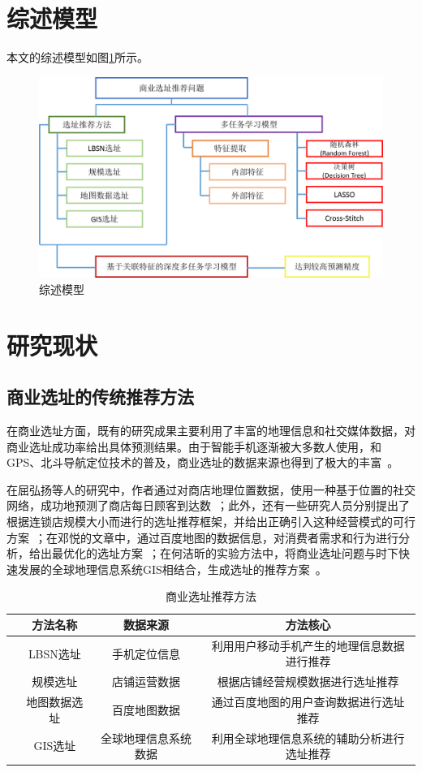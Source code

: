 \documentclass{llncs}
\begin{document}
\section{综述模型}
本文的综述模型如图\ref{model}所示。
\begin{figure}
	\centering
	\includegraphics[width=0.8\columnwidth]{figures/model.png}
	\caption{综述模型}
	\label{model}
\end{figure}

\section{研究现状}
\subsection{商业选址的传统推荐方法}
在商业选址方面，既有的研究成果主要利用了丰富的地理信息和社交媒体数据，对商业选址成功率给出具体预测结果。由于智能手机逐渐被大多数人使用，和GPS、北斗导航定位技术的普及，商业选址的数据来源也得到了极大的丰富~\cite{zhao2017mining,chen2017mining}。

在屈弘扬等人的研究中，作者通过对商店地理位置数据，使用一种基于位置的社交网络，成功地预测了商店每日顾客到达数~\cite{LBSN}；此外，还有一些研究人员分别提出了根据连锁店规模大小而进行的选址推荐框架，并给出正确引入这种经营模式的可行方案~\cite{chainDev,Fu2015Modeling}；在邓悦的文章中，通过百度地图的数据信息，对消费者需求和行为进行分析，给出最优化的选址方案~\cite{DengYue}；在何洁昕的实验方法中，将商业选址问题与时下快速发展的全球地理信息系统GIS相结合，生成选址的推荐方案~\cite{HeJiexin}。

\begin{table}[!hpt]
	\centering
	\caption{商业选址推荐方法}
	\label{tb:reco-method}
	\begin{tabular}{cc|c|c}
		\hline
		& \textbf{方法名称}  & \textbf{数据来源} & \textbf{方法核心}  \\ \hline
		& LBSN选址 & 手机定位信息  & 利用用户移动手机产生的地理信息数据进行推荐       \\ %
		& 规模选址   & 店铺运营数据     & 根据店铺经营规模数据进行选址推荐                                \\ %
		& 地图数据选址  & 百度地图数据  & 通过百度地图的用户查询数据进行选址推荐                                \\ %
		& GIS选址  & 全球地理信息系统数据 & 利用全球地理信息系统的辅助分析进行选址推荐                  \\ \hline
	\end{tabular}
\end{table}
\end{document}
